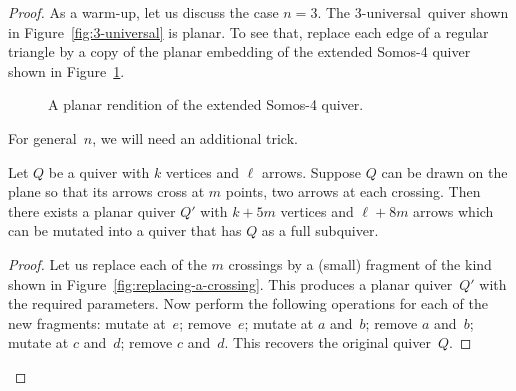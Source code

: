 \begin{proof}
As a warm-up, let us discuss the case $n=3$. %
The 3-universal~quiver shown in Figure~\ref{fig:3-universal} is planar. 
To see that, replace each edge of a regular triangle by a copy of the planar embedding of the extended Somos-4 quiver shown in Figure~\ref{fig:flattened-Somos-4}.

\begin{figure}[ht]\centering
{}

\caption{A planar rendition of the extended Somos-4 quiver. }
\label{fig:flattened-Somos-4}
\end{figure}


For general~$n$, we will need an additional trick. 

\begin{lemma}
\label{lem:resolving-crossings}
Let $Q$ be a quiver with $k$ vertices and $\ell$ arrows.
Suppose $Q$ can be drawn on the plane so that its arrows cross at $m$ points, two arrows at each crossing. Then there exists a planar quiver $Q'$ with $k+5m$ vertices and $\ell+8m$ arrows which can be mutated into a quiver that has $Q$ as a full subquiver. 
\end{lemma}

\begin{proof}
Let us replace each of the $m$ crossings by a (small) fragment of the kind shown in Figure~\ref{fig:replacing-a-crossing}. 
This produces a planar quiver~$Q'$ with the required parameters. Now perform the following operations for each of the new fragments: 
mutate at~$e$; remove~$e$; 
mutate at $a$ and~$b$; remove $a$ and~$b$;
mutate at $c$ and~$d$; remove $c$ and~$d$. 
This recovers the original quiver~$Q$. 
\end{proof}


\end{proof}
